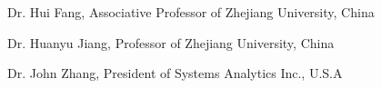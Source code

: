 \begin{cvitems}
\item{Dr. Hui Fang, Associative Professor of Zhejiang University, China}
\item{Dr. Huanyu Jiang, Professor of Zhejiang University, China}
\item{Dr. John Zhang, President of Systems Analytics Inc., U.S.A}
\end{cvitems}